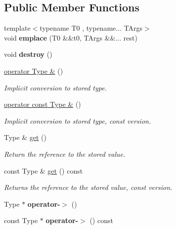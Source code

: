 \subsection*{Public Member Functions}
\begin{DoxyCompactItemize}
\item 
\hypertarget{classShadow_a6b9f4601d139818a05c07fe6d6c732c0}{}\label{classShadow_a6b9f4601d139818a05c07fe6d6c732c0} 
{\footnotesize template$<$typename T0 , typename... T\+Args$>$ }\\void {\bfseries emplace} (T0 \&\&t0, T\+Args \&\&... rest)
\item 
\hypertarget{classShadow_a53136ec46fb68619652ef25bd3fa512b}{}\label{classShadow_a53136ec46fb68619652ef25bd3fa512b} 
void {\bfseries destroy} ()
\item 
\hypertarget{classShadow_abf9c3bfc72664efeb45e720f313dbccc}{}\label{classShadow_abf9c3bfc72664efeb45e720f313dbccc} 
\hyperlink{classShadow_abf9c3bfc72664efeb45e720f313dbccc}{operator Type \&} ()
\begin{DoxyCompactList}\small\item\em Implicit conversion to stored type. \end{DoxyCompactList}\item 
\hypertarget{classShadow_a105a239f6888c7c6a0747dab7e0e9b3d}{}\label{classShadow_a105a239f6888c7c6a0747dab7e0e9b3d} 
\hyperlink{classShadow_a105a239f6888c7c6a0747dab7e0e9b3d}{operator const Type \&} ()
\begin{DoxyCompactList}\small\item\em Implicit conversion to stored type, const version. \end{DoxyCompactList}\item 
\hypertarget{classShadow_ac1e29c2df572ad24e55af67605fda05b}{}\label{classShadow_ac1e29c2df572ad24e55af67605fda05b} 
Type \& \hyperlink{classShadow_ac1e29c2df572ad24e55af67605fda05b}{get} ()
\begin{DoxyCompactList}\small\item\em Return the reference to the stored value. \end{DoxyCompactList}\item 
\hypertarget{classShadow_aaa56a4059c2f050c59fc118ff2c4de23}{}\label{classShadow_aaa56a4059c2f050c59fc118ff2c4de23} 
const Type \& \hyperlink{classShadow_aaa56a4059c2f050c59fc118ff2c4de23}{get} () const
\begin{DoxyCompactList}\small\item\em Returns the reference to the stored value, const version. \end{DoxyCompactList}\item 
\hypertarget{classShadow_a8fead834492f436012800fbc1c959f68}{}\label{classShadow_a8fead834492f436012800fbc1c959f68} 
Type $\ast$ {\bfseries operator-\/$>$} ()
\item 
\hypertarget{classShadow_a029c58f5b34eed75a3302f786291a1d3}{}\label{classShadow_a029c58f5b34eed75a3302f786291a1d3} 
const Type $\ast$ {\bfseries operator-\/$>$} () const
\end{DoxyCompactItemize}


